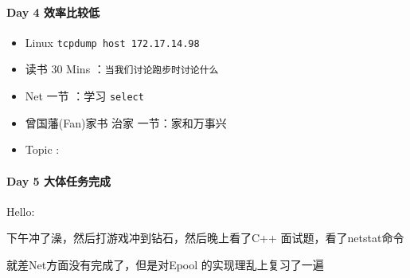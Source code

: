 \documentclass[UTF8,a4paper,8pt]{ctexart}
\begin{document}
 	 \paragraph{Day 4    效率比较低   \quad     }
		 	 \begin{itemize}[itemindent = 1em]
		 	 	\renewcommand\labelitemi{\makebox[0pt][l]{$\square$}\hspace{1em}} 
		 	 	\renewcommand\labelitemi{\makebox[0pt][l]{$\square$}\raisebox{.15ex}{\hspace{0.1em}$\checkmark$}}	 	
		 	 	\item   Linux \verb|tcpdump host 172.17.14.98|
		 	 	
		 	 	\item   读书  30 Mins	：\verb|当我们讨论跑步时讨论什么|
		 	 	\item   Net 一节 ：学习 \verb|select|	
		 	 	\renewcommand\labelitemi{\makebox[0pt][l]{$\square$}\hspace{1em}} 
		 	 	
		 	 	
		 	 	\renewcommand\labelitemi{\makebox[0pt][l]{$\square$}\raisebox{.15ex}{\hspace{0.1em}$\checkmark$}}
		 	 	\item   曾国藩(Fan)家书 治家 一节：家和万事兴
		 	 	\item   Topic :
		 	 \end{itemize}
 	 \paragraph{Day 5    大体任务完成   \quad     }
		 	Hello:
		 	
		 	下午冲了澡，然后打游戏冲到钻石，然后晚上看了C++ 面试题，看了netstat命令
		 	
		 	就差Net方面没有完成了，但是对Epool 的实现理乱上复习了一遍
		 	
\end{document}
